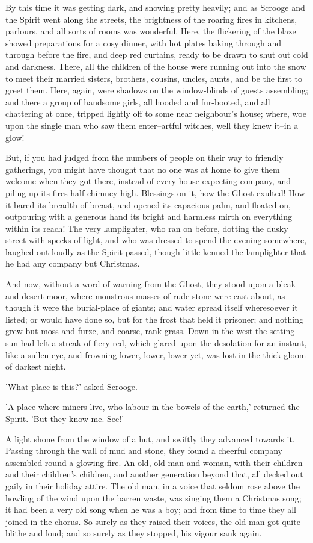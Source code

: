 By this time it was getting dark, and snowing pretty heavily; and as
Scrooge and the Spirit went along the streets, the brightness of the
roaring fires in kitchens, parlours, and all sorts of rooms was
wonderful. Here, the flickering of the blaze showed preparations for a
cosy dinner, with hot plates baking through and through before the fire,
and deep red curtains, ready to be drawn to shut out cold and darkness.
There, all the children of the house were running out into the snow to
meet their married sisters, brothers, cousins, uncles, aunts, and be the
first to greet them. Here, again, were shadows on the window-blinds of
guests assembling; and there a group of handsome girls, all hooded and
fur-booted, and all chattering at once, tripped lightly off to some near
neighbour's house; where, woe upon the single man who saw them
enter--artful witches, well they knew it--in a glow!

But, if you had judged from the numbers of people on their way to
friendly gatherings, you might have thought that no one was at home to
give them welcome when they got there, instead of every house expecting
company, and piling up its fires half-chimney high. Blessings on it, how
the Ghost exulted! How it bared its breadth of breast, and opened its
capacious palm, and floated on, outpouring with a generous hand its
bright and harmless mirth on everything within its reach! The very
lamplighter, who ran on before, dotting the dusky street with specks of
light, and who was dressed to spend the evening somewhere, laughed out
loudly as the Spirit passed, though little kenned the lamplighter that
he had any company but Christmas.

And now, without a word of warning from the Ghost, they stood upon a
bleak and desert moor, where monstrous masses of rude stone were cast
about, as though it were the burial-place of giants; and water spread
itself wheresoever it listed; or would have done so, but for the frost
that held it prisoner; and nothing grew but moss and furze, and coarse,
rank grass. Down in the west the setting sun had left a streak of fiery
red, which glared upon the desolation for an instant, like a sullen eye,
and frowning lower, lower, lower yet, was lost in the thick gloom of
darkest night.

'What place is this?' asked Scrooge.

'A place where miners live, who labour in the bowels of the earth,'
returned the Spirit. 'But they know me. See!'

A light shone from the window of a hut, and swiftly they advanced
towards it. Passing through the wall of mud and stone, they found a
cheerful company assembled round a glowing fire. An old, old man and
woman, with their children and their children's children, and another
generation beyond that, all decked out gaily in their holiday attire.
The old man, in a voice that seldom rose above the howling of the wind
upon the barren waste, was singing them a Christmas song; it had been a
very old song when he was a boy; and from time to time they all joined
in the chorus. So surely as they raised their voices, the old man got
quite blithe and loud; and so surely as they stopped, his vigour sank
again.

